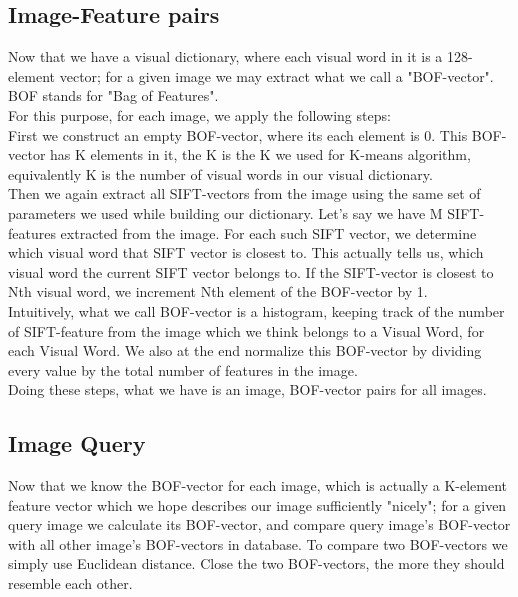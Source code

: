 \documentclass[conference,compsoc]{IEEEtran}
\begin{document}
\subsection{Image-Feature pairs}

Now that we have a visual dictionary, where each visual word in it is a 128-element vector; for a given image we may extract what we call a "BOF-vector". BOF stands for "Bag of Features". \\

For this purpose, for each image, we apply the following steps:\\

First we construct an empty BOF-vector, where its each element is 0. This BOF-vector has K elements in it, the K is the K we used for K-means algorithm, equivalently K is the number of visual words in our visual dictionary. \\

Then we again extract all SIFT-vectors from the image using the same set of parameters we used while building our dictionary. Let's say we have M SIFT-features extracted from the image. For each such SIFT vector, we determine which visual word that SIFT vector is closest to. This actually tells us, which visual word the current SIFT vector belongs to. If the SIFT-vector is closest to Nth visual word, we increment Nth element of the BOF-vector by 1. \\

Intuitively, what we call BOF-vector is a histogram, keeping track of the number of SIFT-feature from the image which we think belongs to a Visual Word, for each Visual Word. We also at the end normalize this BOF-vector by dividing every value by the total number of features in the image.\\

Doing these steps, what we have is an image, BOF-vector pairs for all images.

\subsection{Image Query}

Now that we know the BOF-vector for each image, which is actually a K-element feature vector which we hope describes our image sufficiently "nicely"; for a given query image we calculate its BOF-vector, and compare query image's BOF-vector with all other image's BOF-vectors in database. To compare two BOF-vectors we simply use Euclidean distance. Close the two BOF-vectors, the more they should resemble each other. \\
\end{document}
